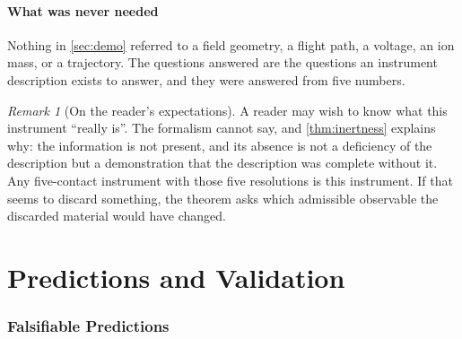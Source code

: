\documentclass[11pt,a4paper]{article}
\theoremstyle{plain}
\theoremstyle{definition}
\theoremstyle{remark}
\newtheorem{remark}[theorem]{Remark}
\begin{document}
\subsection{What was never needed}

Nothing in \cref{sec:demo} referred to a field geometry, a flight path, a
voltage, an ion mass, or a trajectory. The questions answered are the questions
an instrument description exists to answer, and they were answered from five
numbers.

\begin{remark}[On the reader's expectations]
\label{rem:expectations}
A reader may wish to know what this instrument ``really is''. The formalism
cannot say, and \cref{thm:inertness} explains why: the information is not
present, and its absence is not a deficiency of the description but a
demonstration that the description was complete without it. Any five-contact
instrument with those five resolutions is this instrument. If that seems to
discard something, the theorem asks which admissible observable the discarded
material would have changed.
\end{remark}

\part{Predictions and Validation}
\label{part:validation}

\section{Falsifiable Predictions}
\label{sec:predictions}
\end{document}
